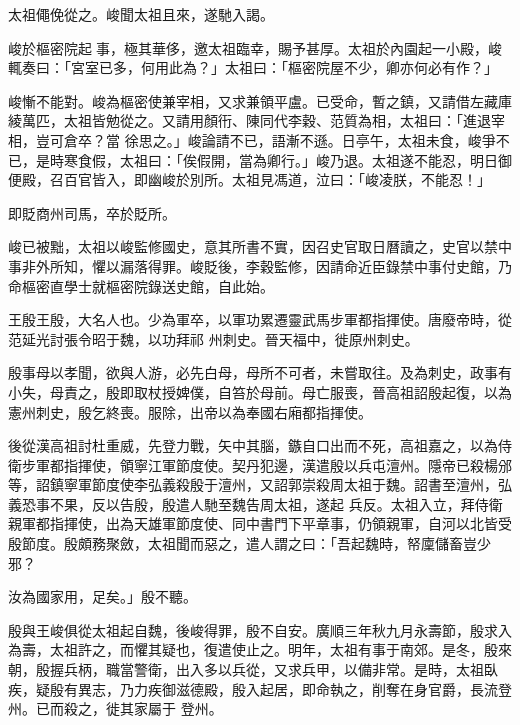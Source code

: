 \begin{pinyinscope}
 太祖僶俛從之。峻聞太祖且來，遂馳入謁。



 峻於樞密院起事，極其華侈，邀太祖臨幸，賜予甚厚。太祖於內園起一小殿，峻輒奏曰：「宮室已多，何用此為？」太祖曰：「樞密院屋不少，卿亦何必有作？」



 峻慚不能對。峻為樞密使兼宰相，又求兼領平盧。已受命，暫之鎮，又請借左藏庫綾萬匹，太祖皆勉從之。又請用顏衎、陳同代李穀、范質為相，太祖曰：「進退宰相，豈可倉卒？當
 徐思之。」峻論請不已，語漸不遜。日亭午，太祖未食，峻爭不已，是時寒食假，太祖曰：「俟假開，當為卿行。」峻乃退。太祖遂不能忍，明日御便殿，召百官皆入，即幽峻於別所。太祖見馮道，泣曰：「峻凌朕，不能忍！」



 即貶商州司馬，卒於貶所。



 峻已被黜，太祖以峻監修國史，意其所書不實，因召史官取日曆讀之，史官以禁中事非外所知，懼以漏落得罪。峻貶後，李穀監修，因請命近臣錄禁中事付史館，乃命樞密直學士就樞密院錄送史館，自此始。



 王殷王殷，大名人也。少為軍卒，以軍功累遷靈武馬步軍都指揮使。唐廢帝時，從范延光討張令昭于魏，以功拜祁
 州刺史。晉天福中，徙原州刺史。



 殷事母以孝聞，欲與人游，必先白母，母所不可者，未嘗取往。及為刺史，政事有小失，母責之，殷即取杖授婢僕，自笞於母前。母亡服喪，晉高祖詔殷起復，以為憲州刺史，殷乞終喪。服除，出帝以為奉國右廂都指揮使。



 後從漢高祖討杜重威，先登力戰，矢中其腦，鏃自口出而不死，高祖嘉之，以為侍衛步軍都指揮使，領寧江軍節度使。契丹犯邊，漢遣殷以兵屯澶州。隱帝已殺楊邠等，詔鎮寧軍節度使李弘義殺殷于澶州，又詔郭崇殺周太祖于魏。詔書至澶州，弘義恐事不果，反以告殷，殷遣人馳至魏告周太祖，遂起
 兵反。太祖入立，拜侍衛親軍都指揮使，出為天雄軍節度使、同中書門下平章事，仍領親軍，自河以北皆受殷節度。殷頗務聚斂，太祖聞而惡之，遣人謂之曰：「吾起魏時，帑廩儲畜豈少邪？



 汝為國家用，足矣。」殷不聽。



 殷與王峻俱從太祖起自魏，後峻得罪，殷不自安。廣順三年秋九月永壽節，殷求入為壽，太祖許之，而懼其疑也，復遣使止之。明年，太祖有事于南郊。是冬，殷來朝，殷握兵柄，職當警衛，出入多以兵從，又求兵甲，以備非常。是時，太祖臥疾，疑殷有異志，乃力疾御滋德殿，殷入起居，即命執之，削奪在身官爵，長流登州。已而殺之，徙其家屬于
 登州。




\end{pinyinscope}
